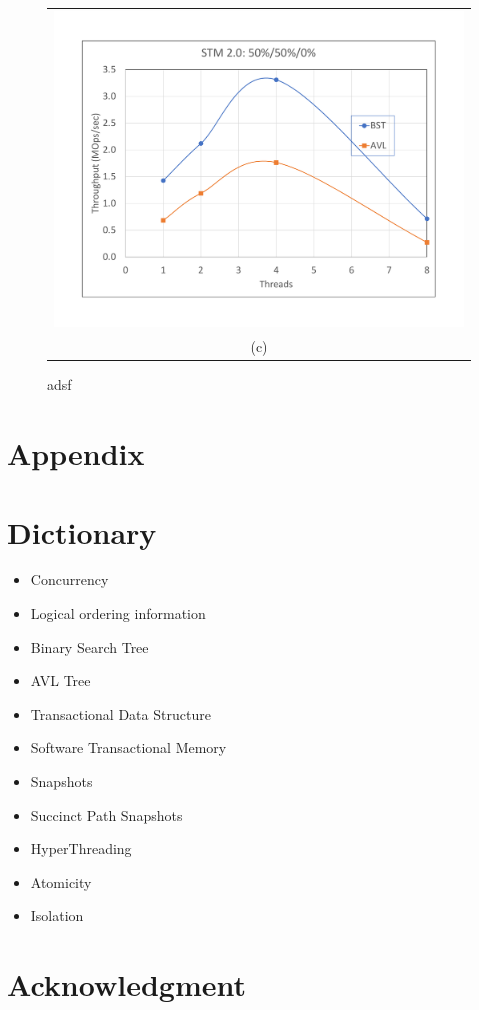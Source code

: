 \documentclass[conference]{IEEEtran}
\begin{document}
\begin{figure}[H]
\begin{tabular}{c}
\includegraphics[width =\linewidth]{figures/stm2-50-50-0} \\
(c) 
\end{tabular}
\caption{adsf}
\end{figure}


\section{Appendix}

\section{Dictionary}
\begin{itemize}[label=$\ast$]
	\item Concurrency
	\item Logical ordering information
	\item Binary Search Tree
	\item AVL Tree
	\item Transactional Data Structure
	\item Software Transactional Memory
	\item Snapshots
	\item Succinct Path Snapshots
	\item HyperThreading
	\item Atomicity 
	\item Isolation
\end{itemize}

\section*{Acknowledgment}
\end{document}
